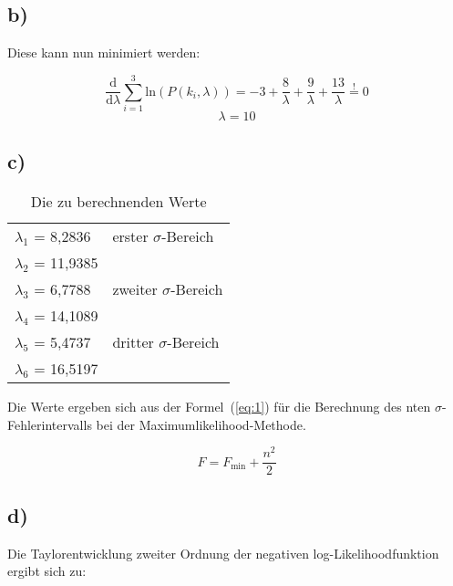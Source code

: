 \subsection*{b)}
Diese kann nun minimiert werden:


\begin{equation*}
\frac{\mathrm{d}}{\mathrm{d}\lambda}\sum_{i=1}^3 \mathrm{ln}(P(k_i,\lambda)) = -3+\frac{8}{\lambda}+\frac{9}{\lambda}+\frac{13}{\lambda} \stackrel{!}{=} 0
\end{equation*}
\begin{equation*}
\lambda = 10
\end{equation*}

\subsection*{c)}
\begin{table}[H]
\centering
\begin{tabular}{ll}
$\lambda_1$ = 8,2836 & erster $\sigma$-Bereich\\
$\lambda_2$ = 11,9385 &\\
$\lambda_3$ = 6,7788 & zweiter $\sigma$-Bereich\\
$\lambda_4$ = 14,1089& \\
$\lambda_5$ = 5,4737 & dritter $\sigma$-Bereich\\
$\lambda_6$ = 16,5197&
\end{tabular}
\caption{Die zu berechnenden Werte}
\end{table}

\noindent
Die Werte ergeben sich aus der Formel~(\ref{eq:1}) für die Berechnung des nten $\sigma$-Fehlerintervalls bei der Maximumlikelihood-Methode.

\begin{equation}
F = F_\text{min}+\frac{n^2}{2}
\label{eq:1}
\end{equation}

\subsection*{d)}

Die Taylorentwicklung zweiter Ordnung der negativen log-Likelihoodfunktion ergibt sich zu:

